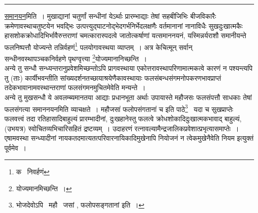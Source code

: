 \documentclass[11pt, openany]{book}
\begin{document}
\hrule

\vspace{2mm}
\underline{समानयन}मिति~। मुखाद्यानां चतुर्णां सन्धीनां येऽर्थाः प्रारम्भाद्याः तेषां सहबीजिभिः बीजविकारैः क्रमेणावस्थाचतुष्टयेन भवद्भिः उत्पत्त्युद्घाटनोद्भेदगर्भनिर्भेदलक्षणैः वर्तमानानां नानाविधैः सुखदुःखात्मकैः हासशोकक्रोधादिभिर्भावैरुत्तराणां चमत्कारास्पदत्वे जातोत्कर्षाणां यत्समाननयनं, यस्मिन्नर्यराशौ समानीयन्ते फलनिष्पत्तौ योज्यन्ते तन्निर्वहणं\renewcommand{\thefootnote}{1}\footnote{क \textendash\ निवर्हणं} पलयोगावस्थया व्याप्तम्~। अत्र केचित्मून् सर्वान् सन्धीनवस्थापञ्चकनिर्वहणे पृथग्वृत्त्या \renewcommand{\thefootnote}{2}\footnote{योज्यमानमिच्छन्ति~।}योज्यमानानिच्छन्ति~।\\

अन्ये तु सन्धौ सन्ध्यन्तरानुप्रवेशमिच्छन्तोऽपि प्रागवस्थाया एकोत्तरावस्थापरिणामात्मकत्वे कारणं न पश्यन्त्यपि तु (ताः) कार्यीभवन्तीति सांख्यदर्शनतच्छायाश्रयेणैकावस्थायाः फलसंबन्धसंगमनोपकरणभावप्राप्तं तदेकभावानामवस्थान्तराणां फलसंगमनमुचितमेवेति मन्यन्ते~।\\

अन्ये तु मुखसन्धौ ये अवलम्ब्यमानतया आद्याः प्रधानभूता अर्थाः उपायास्ते महौजसः फलसंपत्तौ साधकाः तेषां फलसंगत्या समाननयनमिति व्याचक्षते~। {\qt महौजसां फलोपसंगतानां च} इति पाठे\renewcommand{\thefootnote}{3}\footnote{भोजदेवोऽपि \textendash\ {\qt महौ \textendash\ जसां , फलोपसङ्गतानां } इति~।} \textendash\ यदा च सुखप्राप्तेः फलवत्त्वं तदा रतिहासादिबाहुल्यं प्रारम्भादीनां, दुःखहानेस्तु फलत्वे क्रोधशोकादिदुःखात्मकभावाद् बाहुल्यं, (उभयत्र) स्वोचितव्यभिचारिसहितं द्रष्टव्यम्~। उदाहरणं रत्नावल्यामैन्द्रजालिकप्रवेशात्प्रभृत्यासमाप्तेः~। एषामवस्था सन्ध्यादीनां नायकतदमात्यतत्परिवारनायिकादिमुखेनापि नियोजनं न त्वेकमुखेनैवेति नियम इत्युक्तं पूर्वमेव~।

\newpage
\end{document}
